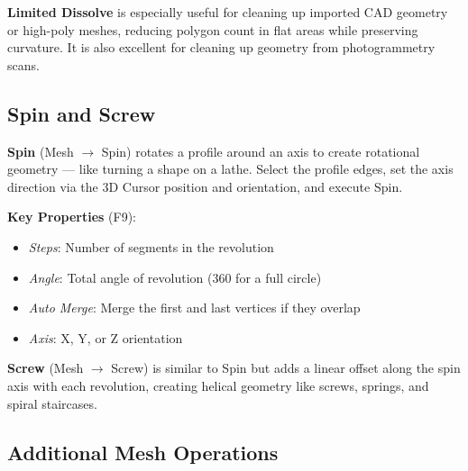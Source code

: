 \begin{tipbox}
\textbf{Limited Dissolve} is especially useful for cleaning up imported CAD geometry or high-poly meshes, reducing polygon count in flat areas while preserving curvature. It is also excellent for cleaning up geometry from photogrammetry scans.
\end{tipbox}

\subsection{Spin and Screw}
\label{sec:spin}

\textbf{Spin} (Mesh $\rightarrow$ Spin) rotates a profile around an axis to create rotational geometry --- like turning a shape on a lathe. Select the profile edges, set the axis direction via the 3D Cursor position and orientation, and execute Spin.

\textbf{Key Properties} (F9):
\begin{itemize}[leftmargin=2em]
  \item \textit{Steps}: Number of segments in the revolution
  \item \textit{Angle}: Total angle of revolution (360 for a full circle)
  \item \textit{Auto Merge}: Merge the first and last vertices if they overlap
  \item \textit{Axis}: X, Y, or Z orientation
\end{itemize}

\textbf{Screw} (Mesh $\rightarrow$ Screw) is similar to Spin but adds a linear offset along the spin axis with each revolution, creating helical geometry like screws, springs, and spiral staircases.

\subsection{Additional Mesh Operations}
\label{sec:additionalops}

